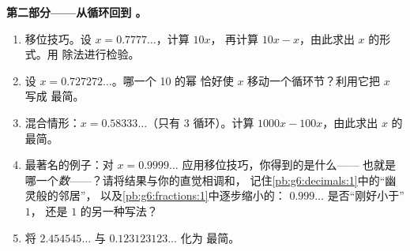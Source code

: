 \begin{problem}
\medskip
\noindent\textbf{第二部分——从循环回到
。}
\begin{enumerate}[resume]
  \item 移位技巧。设 $x = 0.7777\ldots$，计算 $10x$，
        再计算 $10x - x$，由此求出 $x$ 的形式。用
        除法进行检验。
  \item 设 $x = 0.727272\ldots$。哪一个 10 的幂
        恰好使 $x$ 移动一个循环节？利用它把 $x$ 写成
        最简。
  \item 混合情形：$x = 0.58333\ldots$（只有 $3$
        循环）。计算 $1000x - 100x$，由此求出 $x$ 的
        最简。
  \item 最著名的例子：对
        $x = 0.9999\ldots$ 应用移位技巧，你得到的是什么——
        也就是哪一个\emph{数}——？请将结果与你的直觉相调和，
        记住\cref{pb:g6:decimals:1}中的“幽灵般的邻居”，
        以及\cref{pb:g6:fractions:1}中逐步缩小的：
        $0.999\ldots$ 是否“刚好小于”$1$，
        还是 $1$ 的另一种写法？
  \item 将 $2.454545\ldots$ 与 $0.123123123\ldots$ 化为
        最简。
\end{enumerate}


\end{problem}
